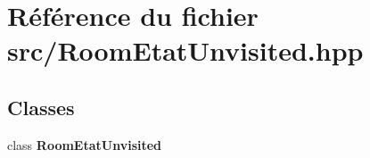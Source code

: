 \section{Référence du fichier src/\-Room\-Etat\-Unvisited.hpp}
\label{_room_etat_unvisited_8hpp}
\subsection*{Classes}
\begin{DoxyCompactItemize}
\item 
class {\bf Room\-Etat\-Unvisited}
\end{DoxyCompactItemize}
